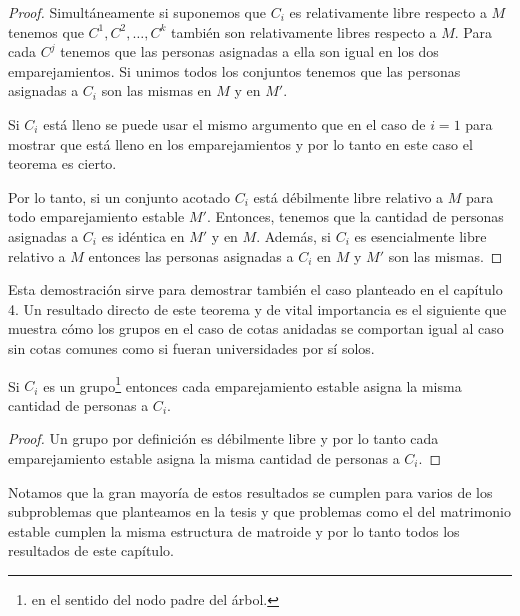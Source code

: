 \begin{proof}
Simultáneamente si suponemos que $C_i$ es relativamente libre respecto a $M$ tenemos que $C^1,C^2,\dots,C^k$ también son relativamente libres respecto a $M$. Para cada $C^j$ tenemos que las personas asignadas a ella son igual en los dos emparejamientos. Si unimos todos los conjuntos tenemos que las personas asignadas a $C_i$ son las mismas en $M$ y en $M'$. 

Si $C_i$ está lleno se puede usar el mismo argumento que en el caso de $i=1$ para mostrar que está lleno en los emparejamientos y por lo tanto en este caso el teorema es cierto. 

Por lo tanto, si un conjunto acotado $C_i$ está débilmente libre relativo a $M$ para todo emparejamiento estable $M'$. Entonces, tenemos que la cantidad de personas asignadas a $C_i$ es idéntica en $M'$ y en $M$. Además, si $C_i$ es esencialmente libre relativo a $M$ entonces las personas asignadas a $C_i$ en $M$ y $M'$ son las mismas. 

\end{proof}

Esta demostración sirve para demostrar también el caso planteado en el capítulo 4. Un resultado directo de este teorema y de vital importancia es el siguiente que muestra cómo los grupos en el caso de cotas anidadas se comportan igual al caso sin cotas comunes como si fueran universidades por sí solos.

\begin{cor}
Si $C_i$ es un grupo\footnote{en el sentido del nodo padre del árbol.} entonces cada emparejamiento estable asigna la misma cantidad de personas a $C_i$.
\end{cor}

\begin{proof}
Un grupo por definición es débilmente libre y por lo tanto cada emparejamiento estable asigna la misma cantidad de personas a $C_i$.
\end{proof}

Notamos que la gran mayoría de estos resultados se cumplen para varios de los subproblemas que planteamos en la tesis y que problemas como el del matrimonio estable cumplen la misma estructura de matroide y por lo tanto todos los resultados de este capítulo.






